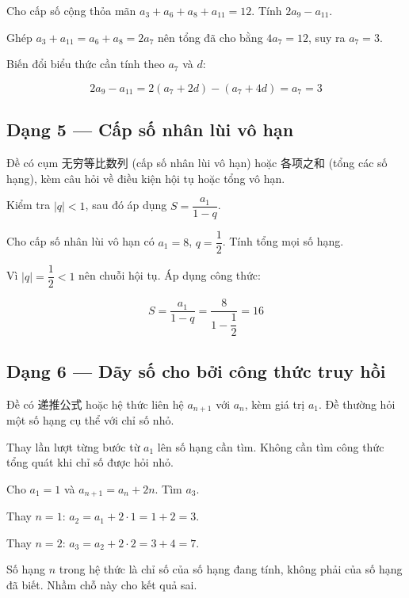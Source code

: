 \documentclass[11pt, a4paper]{article}
\begin{document}
\begin{vidu}[{4}]
Cho cấp số cộng thỏa mãn $a_3 + a_6 + a_8 + a_{11} = 12$. Tính $2a_9 - a_{11}$.

Ghép $a_3 + a_{11} = a_6 + a_8 = 2a_7$ nên tổng đã cho bằng $4a_7 = 12$, suy ra $a_7 = 3$.

Biến đổi biểu thức cần tính theo $a_7$ và $d$:

$$2a_9 - a_{11} = 2(a_7 + 2d) - (a_7 + 4d) = a_7 = 3$$

\end{vidu}
\subsection{Dạng 5 — Cấp số nhân lùi vô hạn}

 Đề có cụm 无穷等比数列 (cấp số nhân lùi vô hạn) hoặc 各项之和 (tổng các số hạng), kèm câu hỏi về điều kiện hội tụ hoặc tổng vô hạn.

 Kiểm tra $|q| < 1$, sau đó áp dụng $S = \dfrac{a_1}{1 - q}$.

\begin{vidu}[{5}]
Cho cấp số nhân lùi vô hạn có $a_1 = 8$, $q = \dfrac{1}{2}$. Tính tổng mọi số hạng.

Vì $|q| = \dfrac{1}{2} < 1$ nên chuỗi hội tụ. Áp dụng công thức:

$$S = \frac{a_1}{1 - q} = \frac{8}{1 - \dfrac{1}{2}} = 16$$

\end{vidu}
\subsection{Dạng 6 — Dãy số cho bởi công thức truy hồi}

 Đề có 递推公式 hoặc hệ thức liên hệ $a_{n+1}$ với $a_n$, kèm giá trị $a_1$. Đề thường hỏi một số hạng cụ thể với chỉ số nhỏ.

 Thay lần lượt từng bước từ $a_1$ lên số hạng cần tìm. Không cần tìm công thức tổng quát khi chỉ số được hỏi nhỏ.

\begin{vidu}[{6}]
Cho $a_1 = 1$ và $a_{n+1} = a_n + 2n$. Tìm $a_3$.

Thay $n = 1$: $a_2 = a_1 + 2 \cdot 1 = 1 + 2 = 3$.

Thay $n = 2$: $a_3 = a_2 + 2 \cdot 2 = 3 + 4 = 7$.

 Số hạng $n$ trong hệ thức là chỉ số của số hạng đang tính, không phải của số hạng đã biết. Nhầm chỗ này cho kết quả sai.

\end{vidu}
\end{document}

